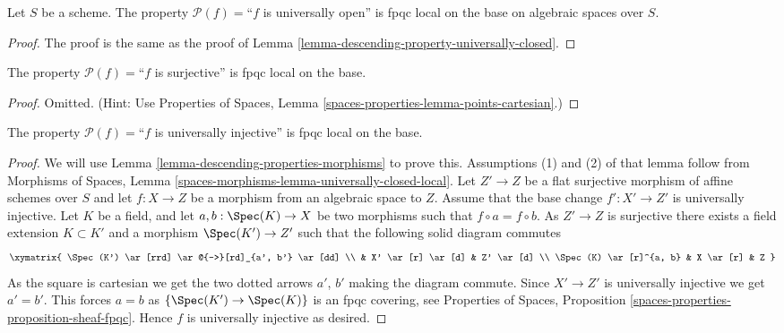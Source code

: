 \begin{lemma}
\label{lemma-descending-property-universally-open}
Let $S$ be a scheme.
The property $\mathcal{P}(f) =$``$f$ is universally open''
is fpqc local on the base on algebraic spaces over $S$.
\end{lemma}

\begin{proof}
The proof is the same as the proof of
Lemma \ref{lemma-descending-property-universally-closed}.
\end{proof}

\begin{lemma}
\label{lemma-descending-property-surjective}
The property $\mathcal{P}(f) =$``$f$ is surjective''
is fpqc local on the base.
\end{lemma}

\begin{proof}
Omitted. (Hint: Use
Properties of Spaces, Lemma \ref{spaces-properties-lemma-points-cartesian}.)
\end{proof}

\begin{lemma}
\label{lemma-descending-property-universally-injective}
The property $\mathcal{P}(f) =$``$f$ is universally injective''
is fpqc local on the base.
\end{lemma}

\begin{proof}
We will use
Lemma \ref{lemma-descending-properties-morphisms}
to prove this. Assumptions (1) and (2) of that lemma follow from
Morphisms of Spaces,
Lemma \ref{spaces-morphisms-lemma-universally-closed-local}.
Let $Z' \to Z$ be a flat surjective morphism of affine schemes
over $S$ and let $f : X \to Z$ be a morphism from an algebraic space to $Z$.
Assume that the base change $f' : X' \to Z'$ is universally injective.
Let $K$ be a field, and let $a, b : \Spec(K) \to X$
be two morphisms such that $f \circ a = f \circ b$.
As $Z' \to Z$ is surjective there exists a field
extension $K \subset K'$ and a morphism
$\Spec(K') \to Z'$
such that the following solid diagram commutes
$$
\xymatrix{
\Spec(K') \ar[rrd] \ar@{-->}[rd]_{a', b'} \ar[dd] \\
 &
X' \ar[r] \ar[d] &
Z' \ar[d] \\
\Spec(K) \ar[r]^{a, b} &
X \ar[r] &
Z
}
$$
As the square is cartesian we get the two dotted arrows $a'$, $b'$ making the
diagram commute. Since $X' \to Z'$ is universally injective we get $a' = b'$.
This forces $a = b$ as $\{\Spec(K') \to \Spec(K)\}$
is an fpqc covering, see
Properties of Spaces, Proposition
\ref{spaces-properties-proposition-sheaf-fpqc}.
Hence $f$ is universally injective as desired.
\end{proof}

